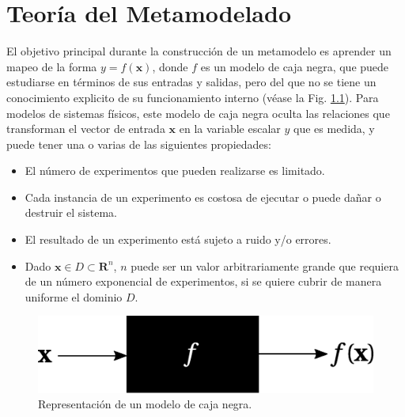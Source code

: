 \chapter{Teoría del Metamodelado}

El objetivo principal durante la construcción de un metamodelo es aprender un mapeo de la forma $y = f(\mathbf{x})$, donde $f$ es un modelo de caja negra, que puede estudiarse en términos de sus entradas y salidas, pero del que no se tiene un conocimiento explicito de su funcionamiento interno (véase la Fig. \ref{fig:blackboxmodel}). Para modelos de sistemas físicos, este modelo de caja negra oculta las relaciones que transforman el vector de entrada $\mathbf{x}$ en la variable escalar $y$ que es medida, y puede tener una o varias de las siguientes propiedades:
\begin{itemize}
\item El número de experimentos que pueden realizarse es limitado.
\item Cada instancia de un experimento es costosa de ejecutar o puede dañar o destruir el sistema.
\item El resultado de un experimento está sujeto a ruido y/o errores.
\item Dado $\mathbf{x}\in D \subset \mathbf{R}^n$, $n$ puede ser un valor arbitrariamente grande que requiera de un número exponencial de experimentos, si se quiere cubrir de manera uniforme el dominio $D$.
\end{itemize}

\begin{figure}[hbt]
\centering
\includegraphics[scale=0.25]{../img/Construccion_de_un_Metamodelo/blackboxmodel.eps}
\caption{Representación de un modelo de caja negra.}
\label{fig:blackboxmodel}
\end{figure}

